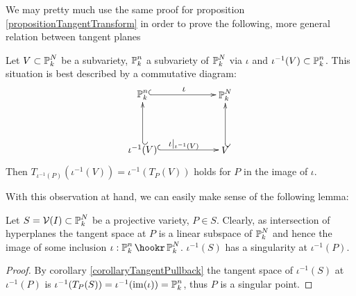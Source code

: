 We may pretty much use the same proof for proposition \ref{propositionTangentTransform} in order to prove the following, more general relation between tangent planes
\begin{corollary} \label{corollaryTangentPullback}
Let $V\subset \operatorname{\mathbb P}^N_k$ be a subvariety, $\operatorname{\mathbb P}^n_k$ a subvariety of $\operatorname{\mathbb P}^N_k$ via $\iota$ and $\iota^{-1}(V) \subset \operatorname{\mathbb P}^n_k$. This situation is best described by a commutative diagram:
\begin{equation}
\begin{xy}
(0,20)*+{\proj^n_k}="pn";
(30,20)*+{\proj^N_k}="pN";
(0,0)*+{\iota^{-1}(V)}="iv";
(30,0)*+{V}="v";
{\ar@{^{(}->} "pn";"pN"}?*!/_2mm/{\iota};
{\ar@{^{(}->} "iv";"v"}?*!/_2mm/{\iota|_{\iota^{-1}(V)}};
{\ar@{_{(}->} "iv";"pn"};
{\ar@{_{(}->} "v";"pN"};
\end{xy}
\end{equation}
Then $T_{\iota^{-1}(P)}(\iota^{-1}(V)) = \iota^{-1}(T_P(V)) $ holds for $P$ in the image of $\iota$.
\end{corollary}

With this observation at hand, we can easily make sense of the following lemma:

\begin{lemma} \label{lemmaIntersectionWithTangent}
Let $S = \operatorname{\mathcal V}(I) \subset \operatorname{\mathbb P}^N_k$ be a projective variety, $P\in S$.
Clearly, as intersection of hyperplanes the tangent space at $P$ is a linear subspace of $\operatorname{\mathbb P}^N_k$ and hence the image of some inclusion $\iota : \proj^n_k \hookr \proj^N_k$.
$\iota^{-1}(S)$ has a singularity at $\iota^{-1}(P)$.
\end{lemma}
\begin{proof}
By corollary \ref{corollaryTangentPullback} the tangent space of $\iota^{-1}(S)$ at $\iota^{-1}(P)$ is $\iota^{-1}(T_P(S)) = \iota^{-1}({\operatorname{im}}(\iota)) = \operatorname{\mathbb P}^n_k$, thus $P$ is a singular point.
\end{proof}
